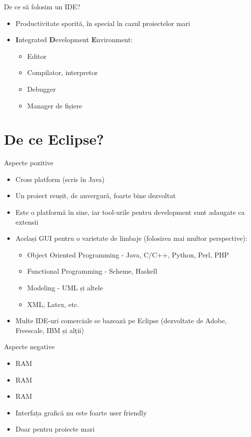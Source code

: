\documentclass{beamer}
\begin{document}
\begin{frame}{De ce să folosim un IDE?}
  \begin{itemize}
  \pause
  \item Productivitate sporită, în special în cazul proiectelor mari
  \pause
  \item \textbf{I}ntegrated \textbf{D}evelopment \textbf{E}nvironment:
		\begin{itemize} 
		\pause
	  \item Editor
  	\pause
	  \item Compilator, interpretor
  	\pause
	  \item Debugger
		\pause
	  \item Manager de fișiere
  	\end{itemize}
  \end{itemize}
\end{frame}

\section{De ce Eclipse?}

\begin{frame}{Aspecte pozitive}
  \begin{itemize}
  \pause
  \item Cross platform (scris în Java)
  \pause
  \item Un proiect reușit, de anvergură, foarte bine dezvoltat
  \pause 
  \item Este o platformă în sine, iar tool-urile pentru development sunt adaugate ca extensii
  \pause
  \item Același GUI pentru o varietate de limbaje (folosirea mai multor perspective):
		\begin{itemize} 
		\pause
	  \item Object Oriented Programming - Java, C/C++, Python, Perl, PHP
  	\pause
	  \item Functional Programming -  Scheme, Haskell
  	\pause
	  \item Modeling - UML și altele
		\pause
	  \item XML, Latex, etc.
	  \pause
  	\end{itemize}
  \item Multe IDE-uri comerciale se bazează pe Eclipse (dezvoltate de Adobe, Freescale, IBM și alții)
\end{itemize}    
\end{frame}


\begin{frame}{Aspecte negative}
  \begin{itemize}
  \pause
  \item RAM
  \pause
  \item RAM
  \pause
  \item RAM
  \pause
  \item Interfața grafică nu este foarte user friendly 
  \pause 
  \item Doar pentru proiecte mari
  \pause
\end{itemize}    
\end{frame}
\end{document}
